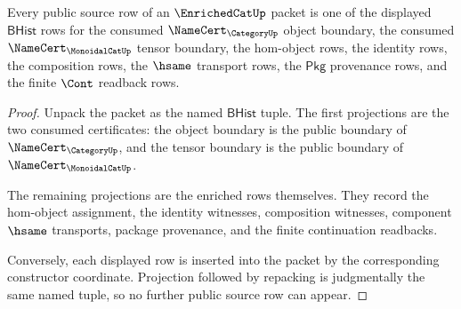 \begin{theorem}\label{thm:enrichedcat-source-obligation}
Every public source row of an $\EnrichedCatUp$ packet is one of the displayed
$\mathsf{BHist}$ rows for the consumed $\NameCert_{\CategoryUp}$ object
boundary, the consumed $\NameCert_{\MonoidalCatUp}$ tensor boundary, the
hom-object rows, the identity rows, the composition rows, the $\hsame$
transport rows, the $\mathsf{Pkg}$ provenance rows, and the finite $\Cont$
readback rows.
\end{theorem}
\begin{proof}
Unpack the packet as the named $\mathsf{BHist}$ tuple. The first projections are
the two consumed certificates: the object boundary is the public boundary of
$\NameCert_{\CategoryUp}$, and the tensor boundary is the public boundary of
$\NameCert_{\MonoidalCatUp}$.

The remaining projections are the enriched rows themselves. They record the
hom-object assignment, the identity witnesses, composition witnesses, component
$\hsame$ transports, package provenance, and the finite continuation readbacks.

Conversely, each displayed row is inserted into the packet by the corresponding
constructor coordinate. Projection followed by repacking is judgmentally the
same named tuple, so no further public source row can appear.
\end{proof}

